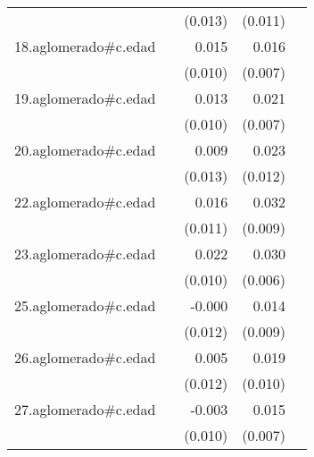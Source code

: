 {\begin{longtable}{l*{4}{D{.}{.}{-1}}}
            &                     &     (0.013)         &     (0.011)         &                     \\
\addlinespace
18.aglomerado#c.edad&                     &       0.015         &       0.016\sym{*}  &                     \\
            &                     &     (0.010)         &     (0.007)         &                     \\
\addlinespace
19.aglomerado#c.edad&                     &       0.013         &       0.021\sym{**} &                     \\
            &                     &     (0.010)         &     (0.007)         &                     \\
\addlinespace
20.aglomerado#c.edad&                     &       0.009         &       0.023\sym{*}  &                     \\
            &                     &     (0.013)         &     (0.012)         &                     \\
\addlinespace
22.aglomerado#c.edad&                     &       0.016         &       0.032\sym{***}&                     \\
            &                     &     (0.011)         &     (0.009)         &                     \\
\addlinespace
23.aglomerado#c.edad&                     &       0.022\sym{*}  &       0.030\sym{***}&                     \\
            &                     &     (0.010)         &     (0.006)         &                     \\
\addlinespace
25.aglomerado#c.edad&                     &      -0.000         &       0.014         &                     \\
            &                     &     (0.012)         &     (0.009)         &                     \\
\addlinespace
26.aglomerado#c.edad&                     &       0.005         &       0.019         &                     \\
            &                     &     (0.012)         &     (0.010)         &                     \\
\addlinespace
27.aglomerado#c.edad&                     &      -0.003         &       0.015\sym{*}  &                     \\
            &                     &     (0.010)         &     (0.007)         &                     \\

\end{longtable}}

